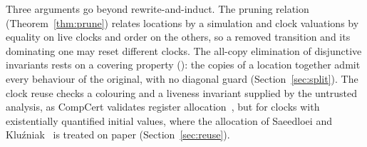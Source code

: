 \documentclass[preprint,12pt]{elsarticle}
\let\pathfragile\path
\DeclareRobustCommand\path{\pathfragile}
\begin{document}
Three arguments go beyond rewrite-and-induct. The pruning relation (Theorem~\ref{thm:prune}) relates locations by a simulation and clock valuations by equality on live clocks and order on the others, so a removed transition and its dominating one may reset different clocks. The all-copy elimination of disjunctive invariants rests on a covering property (): the copies of a location together admit every behaviour of the original, with no diagonal guard (Section~\ref{sec:split}). The clock reuse checks a colouring and a liveness invariant supplied by the untrusted analysis, as CompCert validates register allocation~\cite{rideau_leroy_cc2010}, but for clocks with existentially quantified initial values, where the allocation of Saeedloei and Kluźniak~\cite{saeedloei_kluzniak_hscc2018} is treated on paper (Section~\ref{sec:reuse}).
\end{document}
